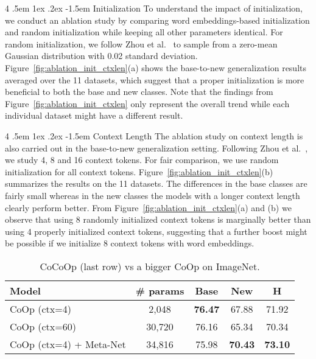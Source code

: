 \documentclass[10pt,twocolumn,letterpaper]{article}
\makeatletter
\renewcommand\paragraph{
  \@startsection{paragraph} {4} {\z@} {.5em \@plus1ex \@minus.2ex} {-1.5em} {\normalfont\normalsize\bfseries} }
\newcommand{\tableCellHeight}{1}
\newcommand{\tabstyle}[1]{
  \setlength{\tabcolsep}{#1}
  \renewcommand{\arraystretch}{\tableCellHeight}
  \centering
  \small
}
\makeatother
\begin{document}
\paragraph{Initialization}
To understand the impact of initialization, we conduct an ablation study by comparing word embeddings-based initialization and random initialization while keeping all other parameters identical. For random initialization, we follow Zhou et al.~\cite{zhou2021coop} to sample from a zero-mean Gaussian distribution with 0.02 standard deviation. Figure~\ref{fig:ablation_init_ctxlen}(a) shows the base-to-new generalization results averaged over the 11 datasets, which suggest that a proper initialization is more beneficial to both the base and new classes. Note that the findings from Figure~\ref{fig:ablation_init_ctxlen} only represent the overall trend while each individual dataset might have a different result.



\paragraph{Context Length}
The ablation study on context length is also carried out in the base-to-new generalization setting. Following Zhou et al.~\cite{zhou2021coop}, we study 4, 8 and 16 context tokens. For fair comparison, we use random initialization for all context tokens. Figure~\ref{fig:ablation_init_ctxlen}(b) summarizes the results on the 11 datasets. The differences in the base classes are fairly small whereas in the new classes the models with a longer context length clearly perform better. From Figure~\ref{fig:ablation_init_ctxlen}(a) and (b) we observe that using 8 randomly initialized context tokens is marginally better than using 4 properly initialized context tokens, suggesting that a further boost might be possible if we initialize 8 context tokens with word embeddings.



\begin{table}[t]
    \tabstyle{3pt}
    \caption{CoCoOp (last row) vs a bigger CoOp on ImageNet.
    }
    \label{tab:vs_bigger_coop}
    \begin{tabular}{l c c c | c}
    \toprule
    Model & \# params & Base & New & H \\
    \midrule
    CoOp (ctx=4) & 2,048 & \textbf{76.47} & 67.88 & 71.92 \\
    CoOp (ctx=60) & 30,720 & 76.16 & 65.34 & 70.34 \\
    \rowcolor{tabhighlight}
    CoOp (ctx=4) + Meta-Net & 34,816 & 75.98 & \textbf{70.43} & \textbf{73.10} \\
    \bottomrule
    \end{tabular}
\end{table}
\end{document}

